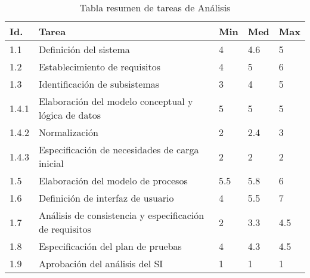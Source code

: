\documentclass[11pt,a4paper,spanish,twoside]{report}
\begin{document}
\begin{table}[!h]
\centering
  \begin{tabular}{|p{0.8cm}||p{8cm}||p{0.75cm}|p{0.75cm}|p{0.75cm}|}
    \hline
    \textbf{Id.} & \textbf{Tarea} & \textbf{Min} &
    \textbf{Med} & \textbf{Max}\\
    \hline \hline
    1.1 & Definición del sistema & 4 & 4.6 & 5\\ 
    \hline
    1.2 & Establecimiento de requisitos & 4 & 5 & 6\\
    \hline
    1.3 & Identificación de subsistemas & 3 & 4 & 5\\
    \hline
    1.4.1 & Elaboración del modelo conceptual y lógica de datos & 5 & 5 & 5\\
    \hline
    1.4.2 & Normalización & 2 & 2.4 & 3 \\
    \hline
    1.4.3 & Especificación de necesidades de carga inicial & 2 & 2 & 2\\
    \hline
    1.5 & Elaboración del modelo de procesos & 5.5 & 5.8 & 6\\
    \hline
    1.6 & Definición de interfaz de usuario & 4 & 5.5 & 7\\
    \hline
    1.7 & Análisis de consistencia y especificación de requisitos & 2 & 3.3 & 4.5\\
    \hline
    1.8 & Especificación del plan de pruebas & 4 & 4.3 & 4.5\\
    \hline
    1.9 & Aprobación del análisis del SI & 1 & 1 & 1\\
    \hline
  \end{tabular}
  \caption{Tabla resumen de tareas de Análisis} \label{Tab:tareas1}
\end{table}
\end{document}
